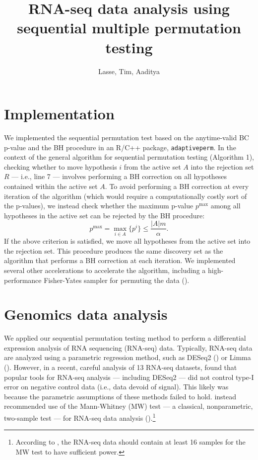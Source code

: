 \documentclass[12pt]{article}
\title{RNA-seq data analysis using sequential multiple permutation testing}
\author{Lasse, Tim, Aaditya}
\begin{document}
	
	\maketitle
	
	\section{Implementation}

	We implemented the sequential permutation test based on the anytime-valid BC p-value and the BH procedure in an R/C++ package, \texttt{adaptiveperm}. In the context of the general algorithm for sequential permutation testing (Algorithm 1), checking whether to move hypothesis $i$ from the active set $A$ into the rejection set $R$ --- i.e., line 7 --- involves performing a BH correction on all hypotheses contained within the active set $A$. To avoid performing a BH correction at every iteration of the algorithm (which would require a computationally costly sort of the p-values), we instead check whether the maximum p-value $p^\textrm{max}$ among all hypotheses in the active set can be rejected by the BH procedure:
	$$ p^\textrm{max} = \max_{i \in A} \{ p^i \} \leq \frac{|A| m}{\alpha}.$$ If the above criterion is satisfied, we move all hypotheses from the active set into the rejection set. This procedure produces the same discovery set as the algorithm that performs a BH correction at each iteration. We implemented several other accelerations to accelerate the algorithm, including a high-performance Fisher-Yates sampler for permuting the data (\cite{Ting2021}).
	
	\section{Genomics data analysis}
	
	We applied our sequential permutation testing method to perform a differential expression analysis of RNA sequencing (RNA-seq) data. Typically, RNA-seq data are analyzed using a parametric regression method, such as DESeq2 (\cite{Love2014}) or Limma (\cite{Ritchie2015}). However, in a recent, careful analysis of 13 RNA-seq datasets, \cite{Li2022} found that popular tools for RNA-seq analysis --- including DESeq2 --- did not control type-I error on negative control data (i.e., data devoid of signal). This likely was because the parametric assumptions of these methods failed to hold. \cite{Li2022} instead recommended use of the Mann-Whitney (MW) test --- a classical, nonparametric, two-sample test --- for RNA-seq data analysis (\cite{Mann1947}).\footnote{According to \cite{Li2022}, the RNA-seq data should contain at least 16 samples for the MW test to have sufficient power.}
	
\end{document}

